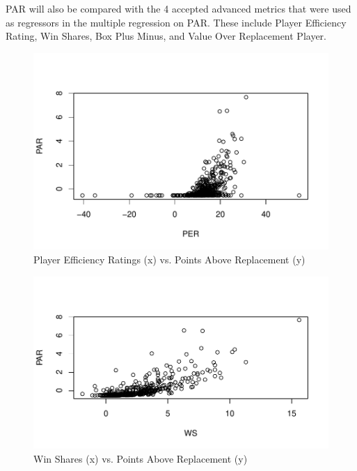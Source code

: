 \documentclass[12pt]{article}
\begin{document}
PAR will also be compared with the 4 accepted advanced metrics that 
were used as regressors in the 
multiple regression on PAR. These include Player Efficiency Rating, Win 
Shares, Box Plus Minus, and 
Value Over Replacement Player.

\begin{figure}[tbp]
  \centering
  \includegraphics[scale = 0.6]{PERvsPAR}
  \caption{Player Efficiency Ratings (x) vs. Points Above Replacement (y)}
  \label{fig:Fig1}
\end{figure}

\begin{figure}[tbp]
  \centering
  \includegraphics[scale = 0.6]{WSvsPAR}
  \caption{Win Shares (x) vs. Points Above Replacement (y)}
  \label{fig:Fig2}
\end{figure}
\end{document}
